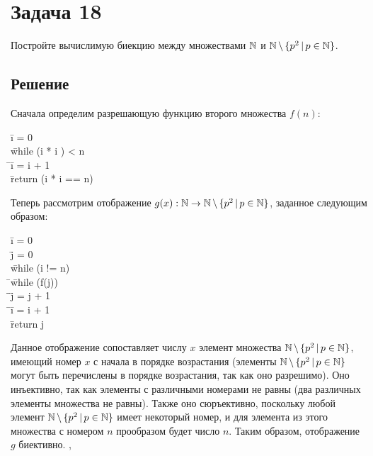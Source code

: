 \documentclass[a4paper,12pt]{article}
\newcommand{\tab}{\quad\=}
\newenvironment{programm}{
    \ttfamily
    \begin{tabbing}
    }
    {
    \end{tabbing}
}
\begin{document}
	\section*{Задача 18}
	Постройте вычислимую биекцию между множествами $\mathbb{N}$ и $\mathbb{N}\,\backslash\,\{p^2\,|\,p\in\mathbb{N}\}$.
	\subsection*{Решение}
	Сначала определим разрешающую функцию второго множества $f(n)$:
    \begin{programm}
    \tab i = 0\\
    \tab while (i * i ) < n\\
    \tab\tab i = i + 1\\
    \tab return (i * i == n)
    \end{programm}
    Теперь рассмотрим отображение $g(x): \mathbb{N}\to\mathbb{N}\,\backslash\,\{p^2\,|\,p\in\mathbb{N}\}$, заданное следующим образом:
	
    \begin{programm}
    \tab i = 0\\
    \tab j = 0\\
    \tab while (i != n)\\
    \tab\tab while (f(j))\\
    \tab\tab\tab j = j + 1\\
    \tab\tab i = i + 1\\
    \tab return j
    \end{programm}
	
	Данное отображение сопоставляет числу $x$ элемент множества $\mathbb{N}\,\backslash\,\{p^2\,|\,p\in\mathbb{N}\}$, имеющий номер $x$ с начала в порядке возрастания (элементы $\mathbb{N}\,\backslash\,\{p^2\,|\,p\in\mathbb{N}\}$ могут быть перечислены в порядке возрастания, так как оно разрешимо). Оно инъективно, так как элементы с различными номерами не равны (два различных элементы множества не равны). Также оно сюръективно, поскольку любой элемент $\mathbb{N}\,\backslash\,\{p^2\,|\,p\in\mathbb{N}\}$ имеет некоторый номер, и для элемента из этого множества с номером $n$ прообразом будет число $n$. Таким образом, отображение $g$ биективно.
	\sep	
	
\end{document}
